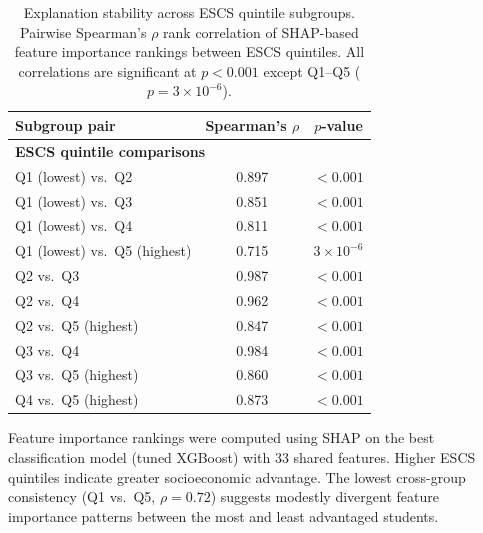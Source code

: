 \begin{table}[htp]
\centering
\caption{Explanation stability across ESCS quintile subgroups. Pairwise Spearman's $\rho$ rank correlation of SHAP-based feature importance rankings between ESCS quintiles. All correlations are significant at $p < 0.001$ except Q1--Q5 ($p = 3 \times 10^{-6}$).}
\label{tab:explanation-stability}
\begin{tabular}{lcc}
\toprule
Subgroup pair & Spearman's $\rho$ & $p$-value \\
\midrule
\multicolumn{3}{l}{\textbf{ESCS quintile comparisons}} \\
Q1 (lowest) vs.\ Q2 & 0.897 & $<0.001$ \\
Q1 (lowest) vs.\ Q3 & 0.851 & $<0.001$ \\
Q1 (lowest) vs.\ Q4 & 0.811 & $<0.001$ \\
Q1 (lowest) vs.\ Q5 (highest) & 0.715 & $3\times10^{-6}$ \\
Q2 vs.\ Q3 & 0.987 & $<0.001$ \\
Q2 vs.\ Q4 & 0.962 & $<0.001$ \\
Q2 vs.\ Q5 (highest) & 0.847 & $<0.001$ \\
Q3 vs.\ Q4 & 0.984 & $<0.001$ \\
Q3 vs.\ Q5 (highest) & 0.860 & $<0.001$ \\
Q4 vs.\ Q5 (highest) & 0.873 & $<0.001$ \\
\bottomrule
\end{tabular}

\par\small Feature importance rankings were computed using SHAP on the best classification model (tuned XGBoost) with 33 shared features. Higher ESCS quintiles indicate greater socioeconomic advantage. The lowest cross-group consistency (Q1 vs.\ Q5, $\rho = 0.72$) suggests modestly divergent feature importance patterns between the most and least advantaged students.
\end{table}
